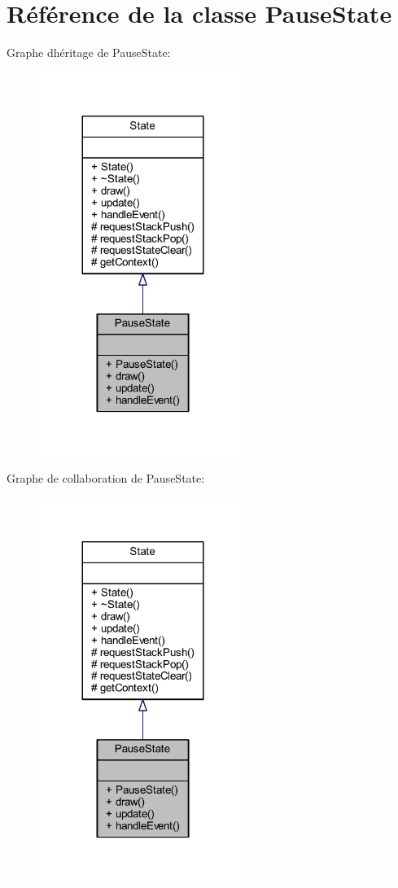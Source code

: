 \hypertarget{class_pause_state}{}\section{Référence de la classe Pause\+State}
\label{class_pause_state}


Graphe d\textquotesingle{}héritage de Pause\+State\+:\nopagebreak
\begin{figure}[H]
\begin{center}
\leavevmode
\includegraphics[width=191pt]{class_pause_state__inherit__graph}
\end{center}
\end{figure}


Graphe de collaboration de Pause\+State\+:\nopagebreak
\begin{figure}[H]
\begin{center}
\leavevmode
\includegraphics[width=191pt]{class_pause_state__coll__graph}
\end{center}
\end{figure}
